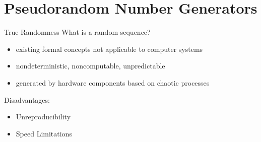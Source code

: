 \documentclass[aspectratio=169]{beamer}
\begin{document}

  \section{Pseudorandom Number Generators} %
  \label{sec:pseudorandom_number_generators}
    \begin{frame}{True Randomness}
      What is a random sequence?
      \pause
      \begin{itemize}
        \item existing formal concepts not applicable to computer systems
        \pause
        \item nondeterministic, noncomputable, unpredictable
        \pause
        \item generated by hardware components based on chaotic processes
      \end{itemize}

      \bigskip

      \pause
      Disadvantages:
      \pause
      \begin{itemize}
        \item Unreproducibility
        \pause
        \item Speed Limitations
      \end{itemize}
    \end{frame}
\end{document}
